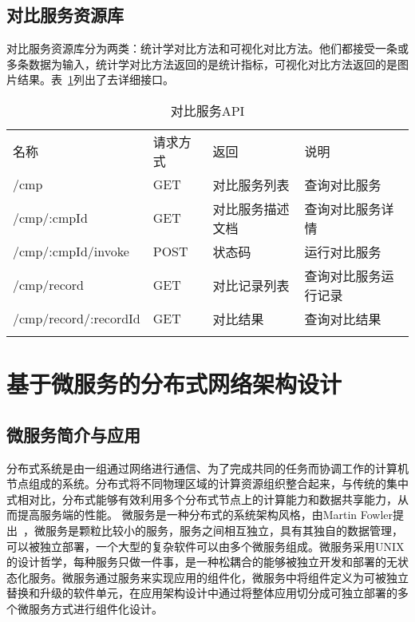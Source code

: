 \subsection{对比服务资源库}
对比服务资源库分为两类：统计学对比方法和可视化对比方法。他们都接受一条或多条数据为输入，统计学对比方法返回的是统计指标，可视化对比方法返回的是图片结果。表~\ref{tab:cmp-service-API}列出了去详细接口。

\begin{table}[!htbp]
    \centering
    \caption{对比服务API}
    \label{tab:cmp-service-API}
    \begin{tabular}{llll}
        \Xhline{1.5pt}
        名称 & 请求方式 & 返回 & 说明 \\
        \Xhline{1.5pt}
        /cmp & GET & 对比服务列表 & 查询对比服务 \\
        /cmp/:cmpId & GET & 对比服务描述文档 & 查询对比服务详情 \\
        /cmp/:cmpId/invoke & POST & 状态码 & 运行对比服务 \\ 
        /cmp/record & GET & 对比记录列表 & 查询对比服务运行记录 \\
        /cmp/record/:recordId & GET & 对比结果 & 查询对比结果 \\
        \Xhline{1.5pt}
    \end{tabular}
\end{table}

\section{基于微服务的分布式网络架构设计}
\subsection{微服务简介与应用}
分布式系统是由一组通过网络进行通信、为了完成共同的任务而协调工作的计算机节点组成的系统。分布式将不同物理区域的计算资源组织整合起来，与传统的集中式相对比，分布式能够有效利用多个分布式节点上的计算能力和数据共享能力，从而提高服务端的性能。
微服务是一种分布式的系统架构风格，由Martin Fowler提出~\cite{fowler2014microservices}，微服务是颗粒比较小的服务，服务之间相互独立，具有其独自的数据管理，可以被独立部署，一个大型的复杂软件可以由多个微服务组成。微服务采用UNIX的设计哲学，每种服务只做一件事，是一种松耦合的能够被独立开发和部署的无状态化服务。微服务通过服务来实现应用的组件化，微服务中将组件定义为可被独立替换和升级的软件单元，在应用架构设计中通过将整体应用切分成可独立部署的多个微服务方式进行组件化设计。

